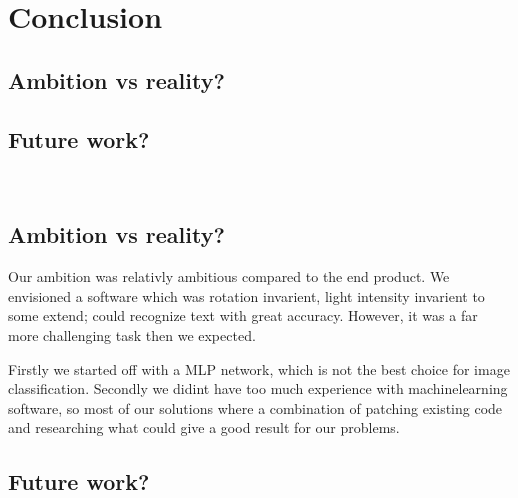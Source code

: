 \documentclass[Report.tex]{subfiles}
\begin{document}
\chapter{Conclusion}
\label{chap:Conclusion}
\section{Ambition vs reality?}
\section{Future work?}

 \\
\section{Ambition vs reality?}
Our ambition was relativly ambitious compared to the end product. We envisioned
a software which was rotation invarient, light intensity invarient to some
extend; could recognize text with great accuracy. However, it was a far more
challenging task then we expected. \par
Firstly we started off with a MLP network, which is not the best choice for
image classification. Secondly we didint have too much experience with
machinelearning software, so most of our solutions where a combination of
patching existing code and researching what could give a good result for
our problems.


\section{Future work?}
\end{document}
